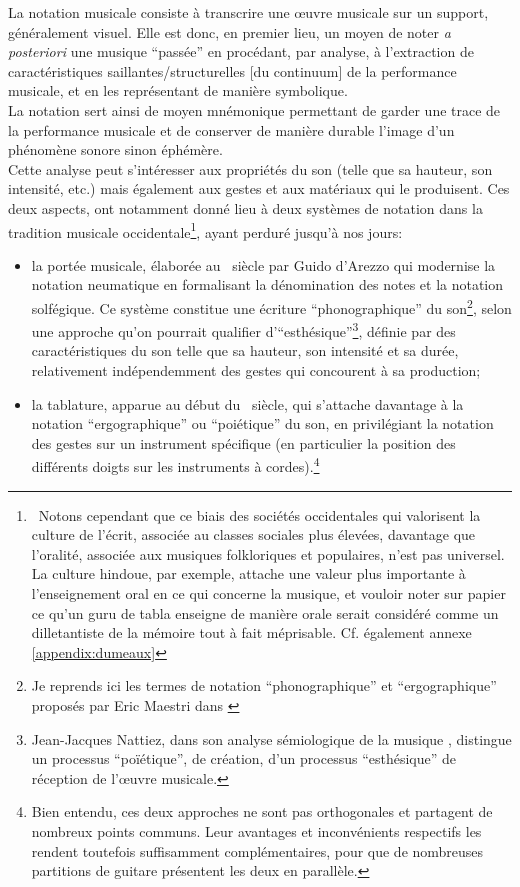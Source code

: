 \noindent La notation musicale consiste à transcrire une œuvre musicale sur un support, généralement visuel. Elle est donc, en premier lieu, un moyen de noter \textit{a posteriori} une musique ``passée'' en procédant, par analyse, à l'extraction de caractéristiques saillantes/structurelles [du continuum] de la performance musicale, et en les représentant de manière symbolique.\\
\indent La notation sert ainsi de moyen mnémonique permettant de garder une trace de la performance musicale et de conserver de manière durable l'image d'un phénomène sonore sinon éphémère.\\
\indent Cette analyse peut s'intéresser aux propriétés du son (telle que sa hauteur, son intensité, etc.) mais également aux gestes et aux matériaux qui le produisent. Ces deux aspects, ont notamment donné lieu à deux systèmes de notation dans la tradition musicale occidentale\footnote{~Notons cependant que ce biais des sociétés occidentales qui valorisent la culture de l'écrit, associée au classes sociales plus élevées, davantage que l'oralité, associée aux musiques folkloriques et populaires, n'est pas universel. La culture hindoue, par exemple, attache une valeur plus importante à l'enseignement oral en ce qui concerne la musique, et vouloir noter sur papier ce qu'un guru de tabla enseigne de manière orale serait considéré comme un dilletantiste de la mémoire tout à fait méprisable. Cf. également annexe \ref{appendix:dumeaux}}, ayant perduré jusqu'à nos jours:
\vspace{-1em}
\begin{itemize}[noitemsep]
	\item la portée musicale, élaborée au ~siècle par Guido d'Arezzo qui modernise la notation neumatique en formalisant la dénomination des notes et la notation solfégique. Ce système constitue une écriture ``phonographique'' du son\footnote{Je reprends ici les termes de notation ``phonographique'' et ``ergographique'' proposés par Eric Maestri dans \cite{maestri_notation_2016}}, selon une approche qu'on pourrait qualifier d'``esthésique''\footnote{Jean-Jacques Nattiez, dans son analyse sémiologique de la musique \cite{nattiez_musicologie_1987}, distingue un processus ``poïétique'', de création, d'un processus ``esthésique'' de réception de l'œuvre musicale.}, définie par des caractéristiques du son telle que sa hauteur, son intensité et sa durée, relativement indépendemment des gestes qui concourent à sa production;
	\item la tablature, apparue au début du ~siècle, qui s'attache davantage à la notation ``ergographique'' ou ``poiétique'' du son, en privilégiant la notation des gestes sur un instrument spécifique (en particulier la position des différents doigts sur les instruments à cordes).\footnote{Bien entendu, ces deux approches ne sont pas orthogonales et partagent de nombreux points communs. Leur avantages et inconvénients respectifs les rendent toutefois suffisamment complémentaires, pour que de nombreuses partitions de guitare présentent les deux en parallèle.}
\end{itemize}


